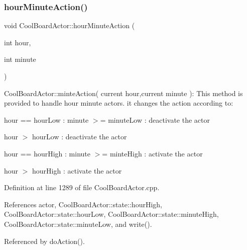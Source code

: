 \subsubsection{\texorpdfstring{hour\+Minute\+Action()}{hourMinuteAction()}}
{\footnotesize\ttfamily void Cool\+Board\+Actor\+::hour\+Minute\+Action (\begin{DoxyParamCaption}\item[{int}]{hour,  }\item[{int}]{minute }\end{DoxyParamCaption})}

Cool\+Board\+Actor\+::minte\+Action( current hour,current minute )\+: This method is provided to handle hour minute actors. it changes the action according to\+:

hour == hour\+Low \+: minute $>$= minute\+Low \+: deactivate the actor

hour $>$ hour\+Low \+: deactivate the actor

hour == hour\+High \+: minute $>$= minte\+High \+: activate the actor

hour $>$ hour\+High \+: activate the actor 

Definition at line 1289 of file Cool\+Board\+Actor.\+cpp.



References actor, Cool\+Board\+Actor\+::state\+::hour\+High, Cool\+Board\+Actor\+::state\+::hour\+Low, Cool\+Board\+Actor\+::state\+::minute\+High, Cool\+Board\+Actor\+::state\+::minute\+Low, and write().



Referenced by do\+Action().

